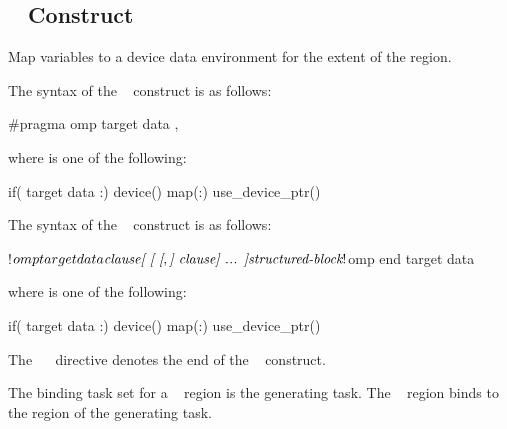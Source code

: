 \subsection{~ Construct}
\label{subsec:target data Construct}
\summary
 Map variables to a device data environment for the extent of the region.
\syntax
\begin{ccppspecific}
The syntax of the ~ construct is as follows:

\begin{ompcPragma}
#pragma omp target data \plc{clause[ [ [},\plc{] clause] ... ] new-line}
\end{ompcPragma}

\begin{samepage}
where  is one of the following:

\begin{indentedcodelist}
if(\plc{[} target data :\plc{] scalar-expression})
device()
map(\plc{[[map-type-modifier[,]] map-type}:\plc{ ] list})
use_device_ptr()
\end{indentedcodelist}
\end{samepage}
\end{ccppspecific}
\medskip

\begin{fortranspecific}
The syntax of the ~ construct is as follows:

\begin{ompfPragma}
!$omp target data \plc{clause[ [ [},\plc{] clause] ... ]}
    \plc{structured-block}
!$omp end target data
\end{ompfPragma}

where  is one of the following:

\begin{indentedcodelist}
if(\plc{[} target data :\plc{] scalar-logical-expression})
device()
map(\plc{[[map-type-modifier[,]] map-type}:\plc{ ] list})
use_device_ptr()
\end{indentedcodelist}

The ~~ directive denotes the end of the ~ construct.
\end{fortranspecific}

\binding
The binding task set for a ~ region is the generating task. The
~ region binds to the region of the generating task.

